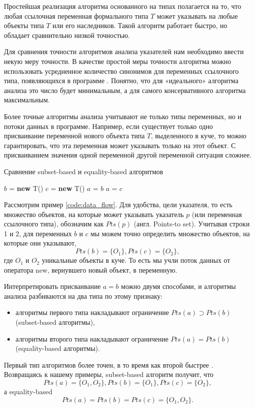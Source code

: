 \documentclass[14pt,titlepage]{extarticle}
\newcommand{\NEW}{\textbf{new }}
\newcommand{\eng}[1]{{\English#1}}
\begin{document}
    Простейшая реализация алгоритма основанного на типах полагается на то, что
    любая ссылочная переменная формального типа $T$ может указывать на любые
    объекты типа $T$ или его наследников. Такой алгоритм работает быстро,
    но обладает сравнительно низкой точностью.

    Для сравнения точности алгоритмов анализа указателей нам необходимо ввести
    некую меру точности. В качестве простой меры точности алгоритма можно
    использовать усредненное количество синонимов для переменных ссылочного
    типа, появляющихся в программе \cite{hind_pointer_analysis_not_solved_yet}.
    Понятно, что для «идеального» алгоритма анализа это число будет
    минимальным, а для самого консервативного алгоритма максимальным.

    Более точные алгоритмы анализа учитывают не только типы переменных,
    но и потоки данных в программе. Например, если существует только
    одно присваивание переменной нового объекта типа $T$, выделенного в куче,
    то можно гарантировать, что эта переменная может указывать только
    на этот объект.
    С присваиванием значения одной переменной другой переменной ситуация
    сложнее.
    \begin{algorithm}
      \caption{Сравнение \eng{subset-based} и \eng{equality-based} алгоритмов}
      \label{code:data_flow}
      \begin{algorithmic}[1]
        \STATE $b$ = \NEW T()
        \STATE $c$ = \NEW T()
        \STATE $a$ = $b$
        \STATE $a$ = $c$
      \end{algorithmic}
    \end{algorithm}
    Рассмотрим пример \ref{code:data_flow}.
    Для удобства, цели указателя, то есть множество объектов, на которые может
    указывать указатель $p$ (или переменная ссылочного типа), обозначим как
    $Pts(p)$ (англ. \eng{Points-to set}).
    Учитывая строки 1 и 2, для переменных $b$ и $c$ мы можем точно определить
    множество объектов, на которые они указывают,
    \[Pts(b) = \{O_1\}, Pts(c) = \{O_2\},\] где $O_1$ и $O_2$ уникальные
    объекты в куче. То есть мы учли поток данных от оператора new,
    вернувшего новый объект, в переменную.

    Интерпретировать присваивание $a = b$ можно двумя способами,
    и алгоритмы анализа разбиваются на два типа по этому признаку:
    \begin{itemize}
      \item алгоритмы первого типа накладывают ограничение
            $Pts(a) \supset Pts(b)$ (\eng{subset-based} алгоритмы),
      \item алгоритмы второго типа накладывают ограничение
            $Pts(a) = Pts(b)$ (\eng{equality-based} алгоритмы).
    \end{itemize}
    Первый тип алгоритмов более точен, в то время как второй быстрее
    \cite{steensgaard}. Возвращаясь к нашему примеры, \eng{subset-based}
    алгоритм получит, что
    \[Pts(a) = \{O_1, O_2\}, Pts(b) = \{O_1\}, Pts(c) = \{O_2\},\]
    а \eng{equality-based}
    \[Pts(a) = Pts(b) = Pts(c) = \{O_1, O_2\}.\]
\end{document}
